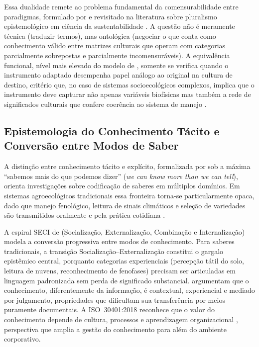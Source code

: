 \documentclass[3p,times]{elsarticle}
\begin{document}
Essa dualidade remete ao problema fundamental da comensurabilidade entre paradigmas, formulado por \citet{Kuhn1962} e revisitado na literatura sobre pluralismo epistemológico em ciência da sustentabilidade \citep{Miller2008}. A questão não é meramente técnica (traduzir termos), mas ontológica (negociar o que conta como conhecimento válido entre matrizes culturais que operam com categorias parcialmente sobrepostas e parcialmente incomensuráveis). A equivalência funcional, nível mais elevado do modelo de \citet{Herdman1999}, somente se verifica quando o instrumento adaptado desempenha papel análogo ao original na cultura de destino, critério que, no caso de sistemas socioecológicos complexos, implica que o instrumento deve capturar não apenas variáveis biofísicas mas também a rede de significados culturais que confere coerência ao sistema de manejo \citep{Guillemin1993,Beaton2000}.

\subsection{Epistemologia do Conhecimento Tácito e Conversão entre Modos de Saber}

A distinção entre conhecimento tácito e explícito, formalizada por \citet{Polanyi1966} sob a máxima ``sabemos mais do que podemos dizer'' (\textit{we can know more than we can tell}), orienta investigações sobre codificação de saberes em múltiplos domínios. Em sistemas agroecológicos tradicionais essa fronteira torna-se particularmente opaca, dado que manejo fenológico, leitura de sinais climáticos e seleção de variedades são transmitidos oralmente e pela prática cotidiana \citep{Berkes2017,Toledo2008}.

A espiral SECI de \citet{Nonaka1995} (Socialização, Externalização, Combinação e Internalização) modela a conversão progressiva entre modos de conhecimento. Para saberes tradicionais, a transição Socialização--Externalização constitui o gargalo epistêmico central, porquanto categorias experienciais (percepção tátil do solo, leitura de nuvens, reconhecimento de fenofases) precisam ser articuladas em linguagem padronizada sem perda de significado substancial. \citet{Davenport1998} argumentam que o conhecimento, diferentemente da informação, é contextual, experiencial e mediado por julgamento, propriedades que dificultam sua transferência por meios puramente documentais. A ISO~30401:2018 reconhece que o valor do conhecimento depende de cultura, processos e aprendizagem organizacional \citep{ISO30401}, perspectiva que amplia a gestão do conhecimento para além do ambiente corporativo.
\end{document}
